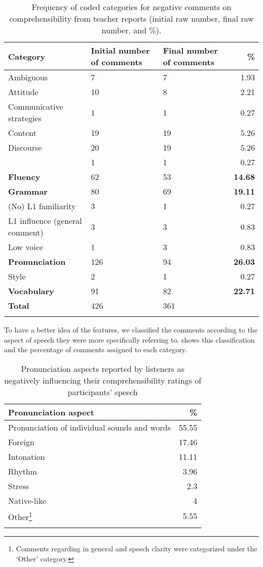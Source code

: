 \documentclass[output=paper]{langsci/langscibook}
\begin{document}
\begin{table}[b]
\caption{Frequency of coded categories for negative comments on comprehensibility from teacher reports (initial raw number, final raw number, and \%).}
\label{tab:delrio:3}
\small
\begin{tabularx}{\textwidth}{lYYr}
\lsptoprule
\bfseries Category & \bfseries Initial number of comments & \bfseries Final number of comments & \bfseries \%\\
\midrule
Ambiguous & 7 & 7 & 1.93\\
Attitude & 10 & 8 & 2.21\\
Communicative strategies & 1 & 1 & 0.27\\
Content & 19 & 19 & 5.26\\
Discourse & 20 & 19 & 5.26\\
  & 1 & 1 & 0.27\\
\textbf{Fluency} & 62 & 53 & \textbf{14.68}\\
\textbf{Grammar} & 80 & 69 & \textbf{19.11}\\
(No) {L1} familiarity & 3 & 1 & 0.27\\
L1 influence (general comment) & 3 & 3 & 0.83\\
Low voice & 1 & 3 & 0.83\\
\textbf{Pronunciation} & 126 & 94 & \textbf{26.03}\\
Style & 2 & 1 & 0.27\\
\textbf{Vocabulary} & 91 & 82 & \textbf{22.71}\\
\midrule
\textbf{Total} & 426 & 361 & \\
\lspbottomrule
\end{tabularx}
\end{table}


To have a better idea of the  features, we classified the comments according to the aspect of speech they were more specifically referring to.  shows this classification and the percentage of comments assigned to each  category.

\begin{table}
\caption{Pronunciation aspects reported by listeners as negatively influencing their comprehensibility ratings of participants’ speech}
\label{tab:delrio:4}

\begin{tabularx}{\textwidth}{Qr}
\lsptoprule

\bfseries Pronunciation aspect & \bfseries \%\\
\midrule
Pronunciation of individual sounds and words & 55.55\\
Foreign  & 17.46\\
Intonation & 11.11\\
Rhythm & 3.96\\
Stress & 2.3\\
Native-like  & 4\\
Other\footnote{Comments regarding  in general and speech clarity were categorized under the ‘Other’ category.} & 5.55\\
\lspbottomrule
\end{tabularx}
\end{table}
\end{document}
